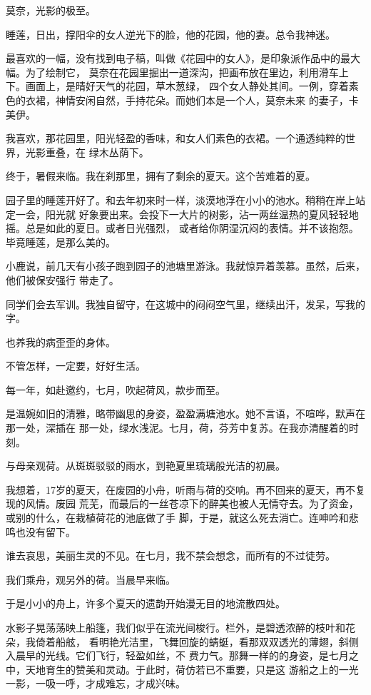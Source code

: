 		莫奈，光影的极至。\par
		睡莲，日出，撑阳伞的女人逆光下的脸，他的花园，他的妻。总令我神迷。

		最喜欢的一幅，没有找到电子稿，叫做《花园中的女人》，是印象派作品中的最大幅。为了绘制它，
	莫奈在花园里掘出一道深沟，把画布放在里边，利用滑车上下。画面上，是晴好天气的花园，草木葱绿，
	四个女人静处其间。一例，穿着素色的衣裙，神情安闲自然，手持花朵。而她们本是一个人，莫奈未来
	的妻子，卡美伊。

		我喜欢，那花园里，阳光轻盈的香味，和女人们素色的衣裙。一个通透纯粹的世界，光影重叠，在
	绿木丛荫下。

		终于，暑假来临。我在刹那里，拥有了剩余的夏天。这个苦难着的夏。

		园子里的睡莲开好了。和去年初来时一样，淡漠地浮在小小的池水。稍稍在岸上站定一会，阳光就
	好象要出来。会投下一大片的树影，沾一两丝温热的夏风轻轻地摇。总是如此的夏日。或者日光强烈，
	或者给你阴湿沉闷的表情。并不该抱怨。毕竟睡莲，是那么美的。

		小鹿说，前几天有小孩子跑到园子的池塘里游泳。我就惊异着羡慕。虽然，后来，他们被保安强行
	带走了。

		同学们会去军训。我独自留守，在这城中的闷闷空气里，继续出汗，发呆，写我的字。\par
		也养我的病歪歪的身体。\par
		不管怎样，一定要，好好生活。

	\endwriting



		每一年，如赴邀约，七月，吹起荷风，款步而至。

		是温婉如旧的清雅，略带幽思的身姿，盈盈满塘池水。她不言语，不喧哗，默声在那一处，深插在
	那一处，绿水浅泥。七月，荷，芬芳中复苏。在我亦清醒着的时刻。

		与母亲观荷。从斑斑驳驳的雨水，到艳夏里琉璃般光洁的初晨。

		我想着，17岁的夏天，在废园的小舟，听雨与荷的交响。再不回来的夏天，再不复现的风情。废园
	荒芜，而最后的一丝苍凉下的醉美也被人无情夺去。为了资金，或别的什么，在栽植荷花的池底做了手
	脚，于是，就这么死去消亡。连呻吟和悲鸣也没有留下。

		谁去哀思，美丽生灵的不见。在七月，我不禁会想念，而所有的不过徒劳。\par
		我们乘舟，观另外的荷。当晨早来临。\par
		于是小小的舟上，许多个夏天的遗韵开始漫无目的地流散四处。

		水影子晃荡荡映上船篷，我们似乎在流光间梭行。栏外，是碧透浓醉的枝叶和花朵，我倚着船舷，
	看明艳光洁里，飞舞回旋的蜻蜓，看那双双透光的薄翅，斜侧入晨早的光线。它们飞行，轻盈如丝，不
	费力气。那舞一样的的身姿，是七月之中，天地育生的赞美和灵动。于此时，荷仿若已不重要，只是这
	游船之上的一光一影，一吸一呼，才成难忘，才成兴味。

